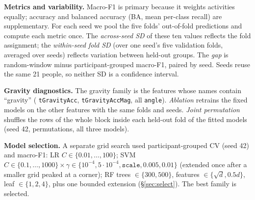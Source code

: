 \documentclass{article}
\begin{document}
\textbf{Metrics and variability.} Macro-F1 is primary because it weights activities equally; accuracy and balanced accuracy (BA, mean per-class recall) are supplementary. For each seed we pool the five folds' out-of-fold predictions and compute each metric once. The \emph{across-seed SD} of these ten values reflects the fold assignment; the \emph{within-seed fold SD} (over one seed's five validation folds, averaged over seeds) reflects variation between held-out groups. The \emph{gap} is random-window minus participant-grouped macro-F1, paired by seed. Seeds reuse the same 21 people, so neither SD is a confidence interval.

\textbf{Gravity diagnostics.} The gravity family is the \Nngrav{} features whose names contain ``gravity'' (\Nntgrav{} \texttt{tGravityAcc}, \Nntgravmag{} \texttt{tGravityAccMag}, all \Nnangle{} \texttt{angle}). \emph{Ablation} retrains the fixed models on the other \Nnkeep{} features with the same folds and seeds. \emph{Joint permutation} shuffles the rows of the whole block inside each held-out fold of the fitted models (seed 42, \Nnperm{} permutations, all three models).

\textbf{Model selection.} A separate grid search used participant-grouped CV (seed 42) and macro-F1: LR $C\in\{0.01,\dots,100\}$; SVM $C\in\{0.1,\dots,1000\}\times\gamma\in\{10^{-4},5{\cdot}10^{-4},\texttt{scale},0.005,0.01\}$ (extended once after a smaller grid peaked at a corner); RF trees $\in\{300,500\}$, features $\in\{\sqrt{d},0.5d\}$, leaf $\in\{1,2,4\}$, plus one bounded extension (\S\ref{sec:select}). The best family is selected.
\end{document}
